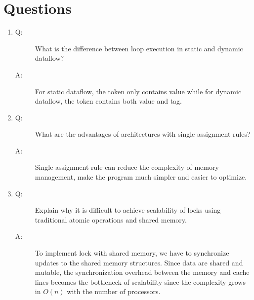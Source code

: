 \documentclass[12pt]{article}
\begin{document}
\section{Questions}
\begin{enumerate}
\item
\begin{description}
\item[Q: ] What is the difference between loop execution in static and 
dynamic dataflow?
\item[A: ] For static dataflow, the token only contains value while for 
dynamic dataflow, the token contains both value and tag.
\end{description}

\item
\begin{description}
\item[Q: ] What are the advantages of architectures with single 
assignment rules?
\item[A: ] Single assignment rule can reduce the complexity of memory
management, make the program much simpler and easier to optimize.
\end{description}

\item
\begin{description}
\item[Q: ] Explain why it is difficult to achieve scalability of 
locks using traditional atomic operations and shared memory.
\item[A: ] To implement lock with shared memory, we have to 
synchronize updates to the shared memory structures. Since data
are shared and mutable, the synchronization overhead between the 
memory and cache lines becomes the bottleneck of scalability since
the complexity grows in $O(n)$ with the number of processors.

\end{description}

\end{enumerate}
\end{document}

